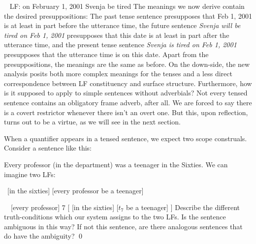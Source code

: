 \ex~ LF: \lb[T$'$] \past \lb[PP] on February 1, 2001 \rb \rb \lb[VP] Svenja be
tired \rb \label{ex:pp-lf}\xe
%
The meanings we now derive contain the desired presuppositions: The past tense
sentence  presupposes that Feb 1, 2001 is at least in part before
the utterance time, the future sentence \emph{Svenja will be tired on Feb 1, 2001}
presupposes that this date is at least in part after the utterance time, and the
present tense sentence \emph{Svenja is tired on Feb 1, 2001} presupposes that the
utterance time is on this date. Apart from the presuppositions, the meanings are
the same as before. On the down-side, the new analysis posits both more complex
meanings for the tenses and a less direct correspondence between LF constituency
and surface structure. Furthermore, how is it supposed to apply to simple
sentences without adverbials? Not every tensed sentence contains an obligatory
frame adverb, after all. We are forced to say there is a covert restrictor
whenever there isn't an overt one. But this, upon reflection, turns out to be a
virtue, as we will see in the next section.

%
\begin{exercise}
When a quantifier appears in a tensed sentence, we expect two scope construals.
Consider a sentence like this:

\ex Every professor (in the department) was a teenager in the Sixties. \xe
%
We can imagine two LFs:

\ex\ [\past in the sixties]  [every professor be a teenager] \xe

\ex~\ [every professor] 7 [ [\past in the sixties] [$t_{7}$ be a teenager] ] \xe
%
Describe the different truth-conditions which our system assigns to the two LFs.
Is the sentence ambiguous in this way? If not this sentence, are there analogous
sentences that do have the ambiguity? \qed
\end{exercise}

